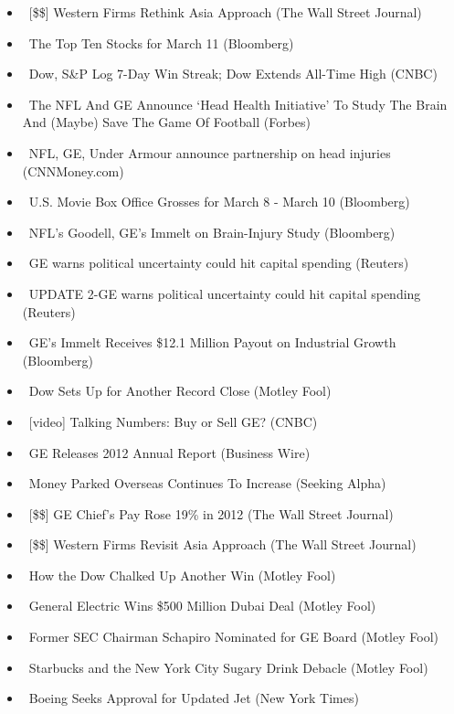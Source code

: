 \documentclass[11pt,asymmetric]{article}
\begin{document}
\begin{itemize}
\item\ [\$\$] Western Firms Rethink Asia Approach (The Wall Street Journal)
\item\ The Top Ten Stocks for March 11 (Bloomberg)
\item\ Dow, S\&P Log 7-Day Win Streak; Dow Extends All-Time High (CNBC)
\item\ The NFL And GE Announce `Head Health Initiative' To Study The Brain And (Maybe) Save The Game Of Football (Forbes)
\item\ NFL, GE, Under Armour announce partnership on head injuries (CNNMoney.com)
\item\ U.S. Movie Box Office Grosses for March 8 - March 10 (Bloomberg)
\item\ NFL's Goodell, GE's Immelt on Brain-Injury Study (Bloomberg)
\item\ GE warns political uncertainty could hit capital spending (Reuters)
\item\ UPDATE 2-GE warns political uncertainty could hit capital spending (Reuters)
\item\ GE’s Immelt Receives \$12.1 Million Payout on Industrial Growth (Bloomberg)
\item\ Dow Sets Up for Another Record Close (Motley Fool)
\item\ [video] Talking Numbers: Buy or Sell GE? (CNBC)
\item\ GE Releases 2012 Annual Report (Business Wire)
\item\ Money Parked Overseas Continues To Increase (Seeking Alpha)
\item\ [\$\$] GE Chief's Pay Rose 19\% in 2012 (The Wall Street Journal)
\item\ [\$\$] Western Firms Revisit Asia Approach (The Wall Street Journal)
\item\ How the Dow Chalked Up Another Win (Motley Fool)
\item\ General Electric Wins \$500 Million Dubai Deal (Motley Fool)
\item\ Former SEC Chairman Schapiro Nominated for GE Board (Motley Fool)
\item\ Starbucks and the New York City Sugary Drink Debacle (Motley Fool)
\item\ Boeing Seeks Approval for Updated Jet (New York Times)
\end{itemize}
\end{document}
